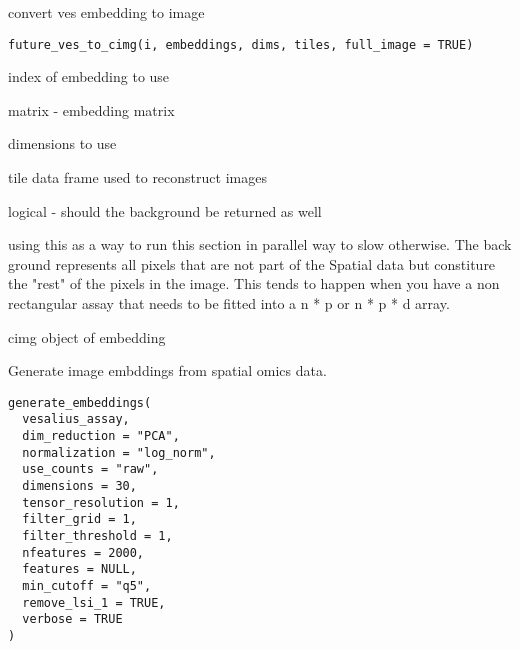 \documentclass[a4paper]{book}
\begin{document}
%
\begin{Description}
convert ves embedding to image
\end{Description}
%
\begin{Usage}
\begin{verbatim}
future_ves_to_cimg(i, embeddings, dims, tiles, full_image = TRUE)
\end{verbatim}
\end{Usage}
%
\begin{Arguments}
\begin{ldescription}
\item[\code{i}] index of embedding to use

\item[\code{embeddings}] matrix - embedding matrix

\item[\code{dims}] dimensions to use

\item[\code{tiles}] tile data frame used to reconstruct images

\item[\code{full\_image}] logical - should the background be returned as well
\end{ldescription}
\end{Arguments}
%
\begin{Details}
using this as a way to run this section in parallel
way to slow otherwise. The back ground represents all pixels that are not 
part of the Spatial data but constiture the "rest" of the pixels in the image.
This tends to happen when you have a non rectangular assay that needs to be fitted
into a n * p or n * p * d array.
\end{Details}
%
\begin{Value}
cimg object of embedding
\end{Value}
%
\begin{Description}
Generate image embddings from spatial omics data.
\end{Description}
%
\begin{Usage}
\begin{verbatim}
generate_embeddings(
  vesalius_assay,
  dim_reduction = "PCA",
  normalization = "log_norm",
  use_counts = "raw",
  dimensions = 30,
  tensor_resolution = 1,
  filter_grid = 1,
  filter_threshold = 1,
  nfeatures = 2000,
  features = NULL,
  min_cutoff = "q5",
  remove_lsi_1 = TRUE,
  verbose = TRUE
)
\end{verbatim}
\end{Usage}
\end{document}
